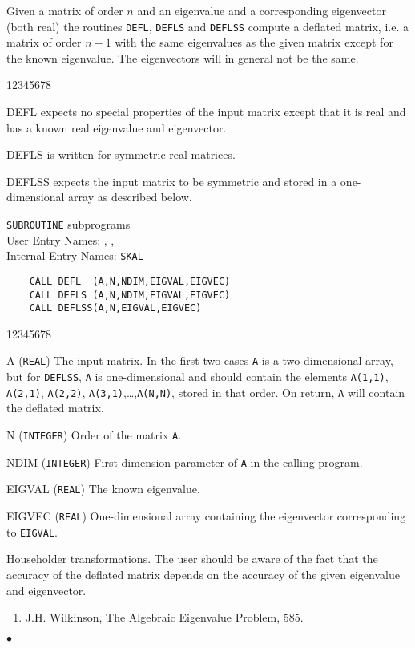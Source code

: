                    
                  
\Submitter{}                         
Given a matrix of order $n$ and an eigenvalue and a corresponding
eigenvector (both real) the routines {\tt DEFL}, {\tt DEFLS} and
{\tt DEFLSS} compute a deflated matrix, i.e. a matrix of order $n-1$
with the same eigenvalues as the given matrix except for the known
eigenvalue. The eigenvectors will in general not be the same.
\begin{DLtt}{12345678}
\item[DEFL] expects no special properties of the input matrix except
that it is real and has a known real eigenvalue and eigenvector.
\item[DEFLS] is written for symmetric real matrices.
\item[DEFLSS] expects the input matrix to be symmetric and stored in a
one-dimensional array as described below.
\end{DLtt}
\Structure
{\tt SUBROUTINE} subprograms \\
User Entry Names: , , \\
Internal Entry Names: {\tt SKAL}
\Usage
\begin{verbatim}
    CALL DEFL  (A,N,NDIM,EIGVAL,EIGVEC)
    CALL DEFLS (A,N,NDIM,EIGVAL,EIGVEC)
    CALL DEFLSS(A,N,EIGVAL,EIGVEC)
\end{verbatim}
\begin{DLtt}{12345678}
\item [A] ({\tt REAL}) The input matrix. In the first two cases {\tt A}
is a two-dimensional array, but for {\tt DEFLSS}, {\tt A} is
one-dimensional and should contain the elements {\tt A(1,1)},
{\tt A(2,1)}, {\tt A(2,2)}, {\tt A(3,1)},\ldots,{\tt A(N,N)},
stored in that order. On return, {\tt A} will contain the deflated
matrix.
\item [N] ({\tt INTEGER}) Order of the matrix {\tt A}.
\item [NDIM] ({\tt INTEGER}) First dimension parameter of {\tt A} in the
calling program.
\item [EIGVAL] ({\tt REAL}) The known eigenvalue.
\item [EIGVEC] ({\tt REAL}) One-dimensional array containing the
eigenvector corresponding to {\tt EIGVAL}.
\end{DLtt}
\Method
Householder transformations.
\Notes
The user should be aware of the fact that the accuracy of the deflated
matrix depends on the accuracy of the given eigenvalue and eigenvector.
\Refer
\begin{enumerate}
\item J.H. Wilkinson, The Algebraic Eigenvalue Problem, 585.
\end{enumerate}
$\bullet$
